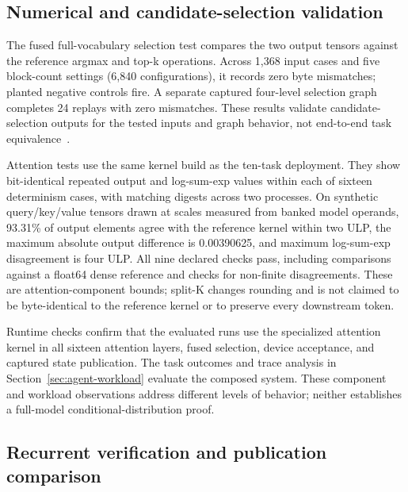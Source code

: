 \documentclass[conference]{IEEEtran}
\begin{document}
\subsection{Numerical and candidate-selection validation}
\label{sec:current-validation}






The fused full-vocabulary selection test compares the two output tensors against the reference argmax and top-k operations. Across 1,368 input cases and five block-count settings (6,840 configurations), it records zero byte mismatches; planted negative controls fire. A separate captured four-level selection graph completes 24 replays with zero mismatches. These results validate candidate-selection outputs for the tested inputs and graph behavior, not end-to-end task equivalence~\cite{lumo2026archive}.

Attention tests use the same kernel build as the ten-task deployment. They show bit-identical repeated output and log-sum-exp values within each of sixteen determinism cases, with matching digests across two processes. On synthetic query/key/value tensors drawn at scales measured from banked model operands, 93.31\% of output elements agree with the reference kernel within two ULP, the maximum absolute output difference is 0.00390625, and maximum log-sum-exp disagreement is four ULP. All nine declared checks pass, including comparisons against a float64 dense reference and checks for non-finite disagreements. These are attention-component bounds; split-K changes rounding and is not claimed to be byte-identical to the reference kernel or to preserve every downstream token.

Runtime checks confirm that the evaluated runs use the specialized attention kernel in all sixteen attention layers, fused selection, device acceptance, and captured state publication. The task outcomes and trace analysis in Section~\ref{sec:agent-workload} evaluate the composed system. These component and workload observations address different levels of behavior; neither establishes a full-model conditional-distribution proof.

\subsection{Recurrent verification and publication comparison}
\label{sec:m1-qualification}

\end{document}
